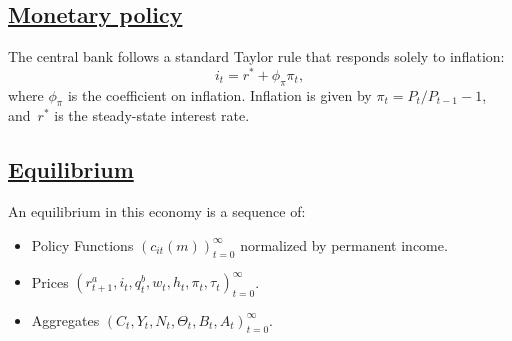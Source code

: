 \documentclass{econsocart}
\begin{document}
\subsection{\href{https://econ-ark.github.io/HAFiscal/\#sec:hank-monetary-policy}{Monetary policy}}\whenintegrated{\label{sec:hank-monetary-policy}}

The central bank follows a standard Taylor rule that responds solely to inflation:
\[
  i_{t} = r^{*} +\phi_{\pi} \pi_{t},
\]
where $\phi_{\pi}$ is the coefficient on inflation. Inflation is given by $\pi_t = P_t/P_{t-1}-1$, and~$r^{*}$ is the steady-state interest rate.

\subsection{\href{https://econ-ark.github.io/HAFiscal/\#sec:hank-equilibrium}{Equilibrium}}\whenintegrated{\label{sec:hank-equilibrium}}

An equilibrium in this economy is a sequence of:
\begin{itemize}[label=--]
  \item
        Policy Functions ${\left( c_{it}(m) \right )}_{t=0}^{\infty}$ normalized by permanent income.
  \item
        Prices $ {\left( r^{a}_{t+1}, i_{t}, q^{b}_{t},  w_{t}, h_{t} , \pi_{t} , \tau_{t} \right) }_{t=0}^{\infty}$.
  \item
        Aggregates $ {\left(C_{t}, Y_{t} , N_{t},   \Theta_{t},  B_{t} , A_{t}  \right)}_{t=0}^{\infty}$.
\end{itemize}
\end{document}
